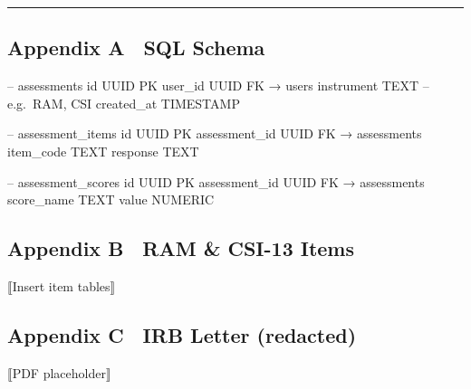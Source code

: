 \begin{center}\rule{0.5\linewidth}{0.5pt}\end{center}

\subsection{Appendix A SQL Schema}\label{appendix-a-sql-schema}

-- assessments id UUID PK user\_id UUID FK → users instrument TEXT --
e.g.~RAM, CSI created\_at TIMESTAMP

-- assessment\_items id UUID PK assessment\_id UUID FK → assessments
item\_code TEXT response TEXT

-- assessment\_scores id UUID PK assessment\_id UUID FK → assessments
score\_name TEXT value NUMERIC

\subsection{Appendix B RAM \& CSI-13
Items}\label{appendix-b-ram-csi-13-items}

⟦Insert item tables⟧

\subsection{Appendix C IRB Letter
(redacted)}\label{appendix-c-irb-letter-redacted}

⟦PDF placeholder⟧
